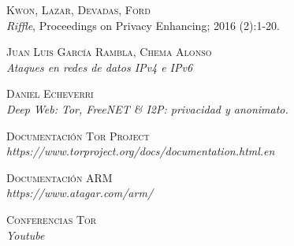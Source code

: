\documentclass[a4paper,twocolumn,10pt]{article}
\begin{document}
\onecolumn
\begin{thebibliography}{11}
	
	\textsc{Kwon, Lazar, Devadas, Ford} \\
	\textit{Riffle}, Proceedings on Privacy Enhancing; 2016 (2):1-20.
	
	\textsc{Juan Luis García Rambla, Chema Alonso} \\
	\textit{Ataques en redes de datos IPv4 e IPv6}
	
	\textsc{Daniel Echeverri} \\
	\textit{Deep Web: Tor, FreeNET \& I2P: privacidad y anonimato.}
	
	\textsc{Documentación Tor Project} \\
	\textit{https://www.torproject.org/docs/documentation.html.en}
	
	\textsc{Documentación ARM} \\
	\textit{https://www.atagar.com/arm/}
	
	\textsc{Conferencias Tor} \\
	\textit{Youtube}

	
\end{thebibliography}	
	
	
\end{document}
